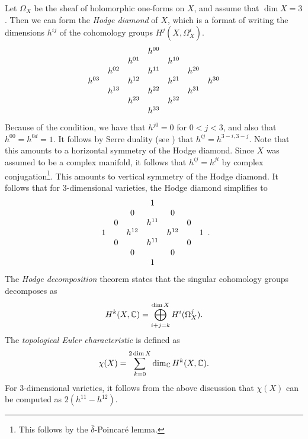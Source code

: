 Let $\Omega_X$ be the sheaf of holomorphic one-forms on $X$, and assume that $\dim X =3$. Then we can form the \emph{Hodge diamond} of $X$, which is a format of writing the dimensions $h^{ij}$ of the cohomology groups $H^j(X,\Omega_X^i)$.
\[
\begin{array}[c]{ccccccc}
&&& h^{00} \\  
 &         & h^{01} & & h^{10}  \\
&	h^{02} && h^{11}  && h^{20}  \\
h^{03} && h^{12} && h^{21} && h^{30} \\
&	h^{13} && h^{22}  && h^{31}  \\
 &         & h^{23} & & h^{32}  \\
 &&& h^{33} 
\end{array}
\]
Because of the \CY condition, we have that $h^{j0}=0$ for $0 < j < 3$, and also that $h^{00}=h^{0d}=1$. It follows by Serre duality (see \cite[Corollary 7.7, Chapter III]{hartshorne}) that $h^{ij}=h^{3-i,3-j}$. Note that this amounts to a horizontal symmetry of the Hodge diamond. Since $X$ was assumed to be a complex manifold, it follows that $h^{ij}=h^{ji}$ by complex conjugation\footnote{This follows by the $\bar \delta$-Poincaré lemma.}. This amounts to vertical symmetry of the Hodge diamond. It follows that for 3-dimensional \CY varieties, the Hodge diamond simplifies to
\[
\begin{array}[c]{ccccccc}
&&& 1 \\  
 &         & 0 & & 0  \\
&	0 && h^{11}  && 0  \\
1 && h^{12} && h^{12} && 1 \\
&	0 && h^{11}  && 0  \\
 &         & 0 & & 0  \\
 &&& 1 
\end{array}.
\]
The \emph{Hodge decomposition} theorem states that the singular cohomology groups decomposes as
$$
H^k(X,\mathbb{C}) = \bigoplus_{i+j=k}^{\dim X} H^i(\Omega_X^j).
$$
The \emph{topological Euler characteristic} is defined as
$$
\chi(X) = \sum_{k=0}^{2 \dim X} \dim_{\mathbb{C}} H^k(X, \mathbb{C}).
$$
For 3-dimensional \CY varieties, it follows from the above discussion that $\chi(X)$ can be computed as $2(h^{11} - h^{12})$. 

